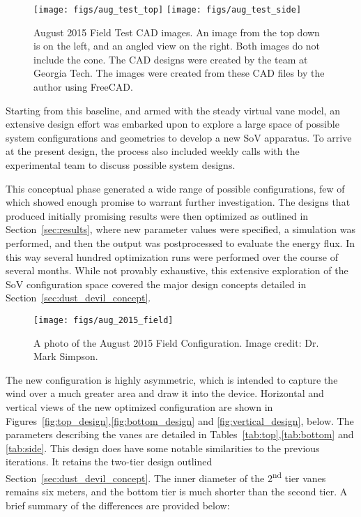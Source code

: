   \begin{figure}
   \centering
   \texttt{[image: figs/aug\_test\_top]}
   \hfill
   \texttt{[image: figs/aug\_test\_side]}
   \caption{August 2015 Field Test CAD images. An image from the top
   down is on the left, and an angled view on the right. Both images do
   not include the cone. The CAD designs were created by the team at
   Georgia Tech. The images were created from these CAD files by the
   author using FreeCAD\cite{Falck}.}  
   \label{fig:cad_aug_2015}
  \end{figure}

Starting from this baseline, and armed with the steady virtual vane
model, an extensive design effort was embarked upon to explore a large space
of possible system configurations and geometries to develop a new 
SoV apparatus. To arrive at the present design, the
process also included weekly calls with the experimental team to discuss
possible system designs.  

This conceptual phase generated a wide range of possible
configurations, few of which showed enough promise to warrant further
investigation. The designs that produced initially promising results were
then optimized as outlined in 
Section~\ref{sec:results}, where new parameter values were specified, a
simulation was performed, and then the output was postprocessed to evaluate the
energy flux. In this way several
hundred optimization runs were performed over the course of several
months. While not provably exhaustive, this extensive exploration of the 
SoV configuration space covered the major design concepts detailed
in Section~\ref{sec:dust_devil_concept}. 

  \begin{figure}
   \centering
   \texttt{[image: figs/aug\_2015\_field]}
   \caption{A photo of the August 2015 Field Configuration. Image
   credit: Dr. Mark Simpson.}  
   \label{fig:aug_2015_field}
  \end{figure}

The new configuration is highly asymmetric, which is intended to capture
the wind over 
a much greater area and draw it into the
device. Horizontal and vertical views of the new optimized configuration
are shown in Figures~\ref{fig:top_design},\ref{fig:bottom_design} and
\ref{fig:vertical_design}, below. The parameters describing the
vanes are detailed in Tables~\ref{tab:top},\ref{tab:bottom} and
\ref{tab:side}. This design does have some notable 
similarities to the previous iterations. It retains the two-tier
design outlined Section~\ref{sec:dust_devil_concept}. The inner diameter 
of the 2\textsuperscript{nd} tier vanes remains six meters, and the
bottom tier is much shorter than the second tier. A brief summary of the
differences are provided below:      

